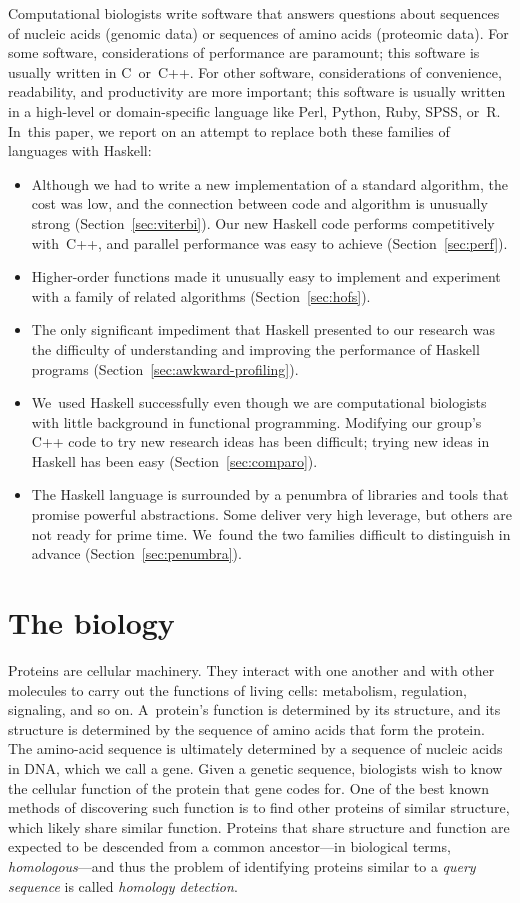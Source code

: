 \documentclass[nonatbib]{sigplanconf}
\newcommand\secref[1]{Section~\ref{sec:#1}}
\begin{document}
Computational biologists write software that answers questions about 
sequences of nucleic acids (genomic data) or sequences of amino 
acids (proteomic data). 
For some software, considerations of performance are paramount; this
software is usually written in C~or~C++. 
For other software, considerations of convenience, readability, and
productivity are more important;
this software is usually written in a high-level
or domain-specific language like
Perl, Python, Ruby, SPSS, or~R.
In~this paper, we report on an attempt to replace both these families
of languages with Haskell: 
\begin{itemize}
\item
Although we had to write a new implementation of a standard
algorithm, the cost was low, and the connection between code and
algorithm is unusually strong (\secref{viterbi}).
Our new Haskell code performs competitively with~C++,
and parallel performance was easy to achieve
(\secref{perf}). 
\item
Higher-order functions made it unusually easy to
implement and experiment with a family of related algorithms
(\secref{hofs}).
\item
The only significant impediment that Haskell presented to our
research was the difficulty of understanding and improving the
performance of Haskell programs (\secref{awkward-profiling}).
\item
We~used Haskell successfully even though we are computational
biologists with little background in functional programming.
Modifying our group's C++ code to try new research ideas has been
difficult;
trying new ideas in Haskell has been easy
(\secref{comparo}).
\item
The Haskell language is surrounded by a penumbra of libraries and tools that
promise powerful abstractions.
Some deliver very high leverage, but others are not ready for prime
time.
We~found the two families difficult to distinguish in advance (\secref{penumbra}).
\end{itemize}




\section{The biology}

Proteins are cellular machinery. They interact with one another and with other 
molecules to carry out the functions of living cells: metabolism, regulation, 
signaling, and so on.
A~protein's function is determined by its structure, 
and its structure is determined by the sequence of amino acids that
form the protein.
The amino-acid sequence is ultimately determined by a sequence of
nucleic acids in DNA, which we call a gene.
Given a genetic sequence, biologists wish to know the cellular
function of the protein that gene codes for.
One of the best known methods of discovering such function is
to find other proteins of 
similar structure, which likely share similar function.
Proteins that share structure and function are expected to be
descended from a common ancestor---in biological terms, \emph{homologous}---and
thus
the problem of identifying proteins similar to a \textit{query sequence} is called 
\textit{homology detection}.
\end{document}
